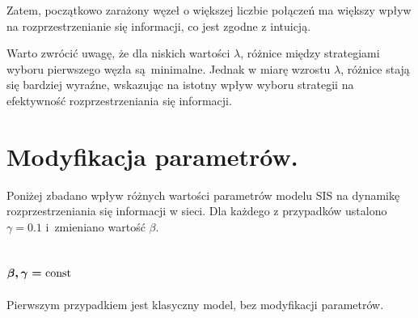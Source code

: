 \documentclass[13pt,a4paper]{article}
\newcommand{\const}{\text{const}}
\begin{document}
Zatem, początkowo zarażony węzeł o większej liczbie połączeń ma większy wpływ na rozprzestrzenianie się informacji, co jest zgodne z intuicją.

Warto zwrócić uwagę, że dla niskich wartości $\lambda$, różnice między strategiami wyboru pierwszego węzła są minimalne. Jednak w miarę wzrostu $\lambda$, różnice stają się bardziej wyraźne, wskazując na istotny wpływ wyboru strategii na efektywność rozprzestrzeniania się informacji.


\section{Modyfikacja parametrów.}

Poniżej zbadano wpływ różnych wartości parametrów modelu SIS na dynamikę rozprzestrzeniania się informacji w sieci. Dla każdego z przypadków ustalono $\gamma=0.1$ i zmieniano wartość $\beta$.

\subsection{$\boldmath{\beta,\gamma}=\const$}

Pierwszym przypadkiem jest klasyczny model, bez modyfikacji parametrów.
\end{document}

